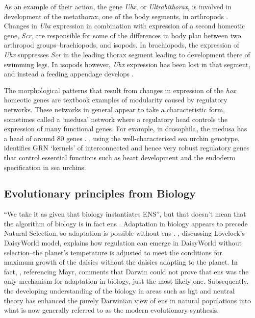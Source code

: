 As an example of their action, the gene \emph{Ubx}, or \emph{Ultrabithorax}, is involved in development of the \gls{metathorax}, one of the body segments, in \glspl{arthropod} \parencite[pg. 696-697]{Watson:2008fm}. Changes in \emph{Ubx} expression in combination with expression of a second homeotic gene, \emph{Scr}, are responsible for some of the differences in body plan between two arthropod groups--brachiopods, and isopods. In brachiopods, the expression of \emph{Ubx} suppresses \emph{Scr} in the leading thorax segment leading to development there of swimming legs. In isopods however, \emph{Ubx} expression has been lost in that segment, and instead a feeding appendage develops \parencite{Watson:2008fm}.

The morphological patterns that result from changes in expression of the \emph{hox} homeotic genes are textbook examples of modularity caused by regulatory networks. These networks in general appear to take a characteristic form, sometimes called a `medusa' network \parencite{Kauffman:2004zi,Aldana:2007da} where a regulatory head controls the expression of many functional genes. For example, in \gls{drosophila}, the medusa has a head of around 80 genes \parencite{Aldana:2007da}. \Textcite{Davidson:2006wi}, using the well-characterised sea urchin genotype, identifies GRN `kernels' of interconnected and hence very robust regulatory genes that control essential functions such as heart development and the endoderm specification in sea urchins. 

\subsection{Evolutionary principles from Biology}

``We take it as given that biology instantiates ENS'', but that doesn't mean that the algorithm of biology is in fact \gls{ens} \parencite{Watson2012}. Adaptation in biology appears to precede Natural Selection, so adaptation is possible without \gls{ens} \cite{Watson2010}. \cite{Saunders1994}, discussing Lovelock's DaisyWorld model, explains how regulation can emerge in DaisyWorld without selection--the planet's temperature is adjusted to meet the conditions for maximum growth of the daisies without the daisies adapting to the planet. In fact, \cite{Saunders1994}, referencing Mayr, comments that Darwin could not prove that \gls{ens} was the only mechanism for adaptation in biology, just the most likely one. Subsequently, the developing understanding of the biology in areas such as \gls{hgt} and neutral theory \cite{Kimura:1968uq} has enhanced the purely Darwinian view of \gls{ens} in natural populations into what is now generally referred to as the modern evolutionary synthesis.


